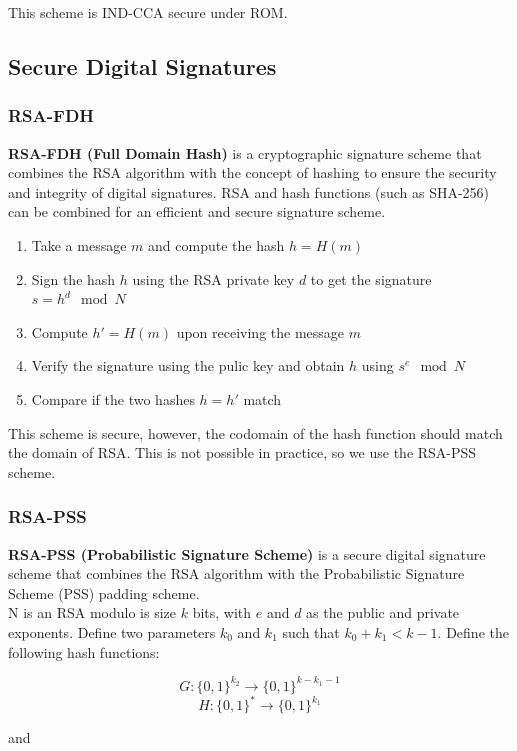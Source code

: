 This scheme is IND-CCA secure under ROM.

\subsection{Secure Digital Signatures} 

\subsubsection{RSA-FDH}
\textbf{RSA-FDH (Full Domain Hash)} is a cryptographic signature scheme that combines the RSA algorithm with the concept of hashing 
to ensure the security and integrity of digital signatures.
RSA and hash functions (such as SHA-256) can be combined for an efficient and secure signature scheme.

\begin{enumerate}
    \item Take a message $m$ and compute the hash $h = H(m)$
    \item Sign the hash $h$ using the RSA private key $d$ to get the signature $s = h^d \mod N$
    \item Compute $h' = H(m)$ upon receiving the message $m$
    \item Verify the signature using the pulic key and obtain $h$ using $s^e \mod N$
    \item Compare if the two hashes $h = h'$ match
\end{enumerate}

This scheme is secure, however, the codomain of the hash function should match the domain of RSA. This is not possible in practice, so we use the RSA-PSS scheme.

\subsubsection{RSA-PSS}
\textbf{RSA-PSS (Probabilistic Signature Scheme)} is a secure digital signature scheme that combines the RSA algorithm with the Probabilistic Signature Scheme (PSS) padding scheme. \\

N is an RSA modulo is size $k$ bits, with $e$ and $d$ as the public and private exponents.
Define two parameters $k_0$ and $k_1$ such that $k_0 + k_1< k -1 $.
Define the following hash functions:

\[ G: \{0,1\}^{k_2}  \rightarrow \{0,1\}^{k - k_1 -1} \]
\[ H: \{0,1\}^* \rightarrow \{0,1\}^{k_1} \]

and

